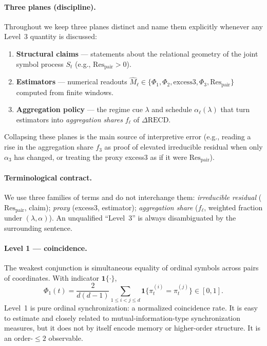 \documentclass[11pt,a4paper]{article}
\begin{document}
\paragraph{Three planes (discipline).}
Throughout we keep three planes distinct and name them explicitly whenever
any Level~3 quantity is discussed:
\begin{enumerate}[leftmargin=*,itemsep=2pt]
  \item \textbf{Structural claims} --- statements about the relational
  geometry of the joint symbol process $S_t$ (e.g.,
  $\mathrm{Res}_{\mathrm{pair}}>0$).
  \item \textbf{Estimators} --- numerical readouts
  $\widehat{M}_\ell\in\{\Phi_1,\Phi_2,\mathrm{excess3},\Phi_3,
  \mathrm{Res}_{\mathrm{pair}}\}$ computed from finite windows.
  \item \textbf{Aggregation policy} --- the regime cue $\lambda$ and
  schedule $\alpha_\ell(\lambda)$ that turn estimators into
  \emph{aggregation shares} $f_\ell$ of $\Delta\mathrm{RECD}$.
\end{enumerate}
Collapsing these planes is the main source of interpretive error
(e.g., reading a rise in the aggregation share $f_3$ as proof of elevated
irreducible residual when only $\alpha_3$ has changed, or treating the
proxy excess3 as if it were $\mathrm{Res}_{\mathrm{pair}}$).

\paragraph{Terminological contract.}
We use three families of terms and do not interchange them:
\emph{irreducible residual} ($\mathrm{Res}_{\mathrm{pair}}$, claim);
\emph{proxy} (excess3, estimator); \emph{aggregation share} ($f_\ell$,
weighted fraction under $(\lambda,\alpha)$). An unqualified ``Level~3''
is always disambiguated by the surrounding sentence.

\paragraph{Level 1 --- coincidence.}
The weakest conjunction is simultaneous equality of ordinal symbols
across pairs of coordinates. With indicator $\mathbf{1}\{\cdot\}$,
\begin{equation}
\label{eq:phi1}
\Phi_1(t)
=\frac{2}{d(d-1)}
\sum_{1\leq i<j\leq d}
\mathbf{1}\bigl\{\pi^{(i)}_t=\pi^{(j)}_t\bigr\}
\in[0,1].
\end{equation}
Level~1 is pure ordinal synchronization: a normalized coincidence rate.
It is easy to estimate and closely related to mutual-information-type
synchronization measures, but it does not by itself encode memory or
higher-order structure. It is an order-$\le 2$ observable.
\end{document}
